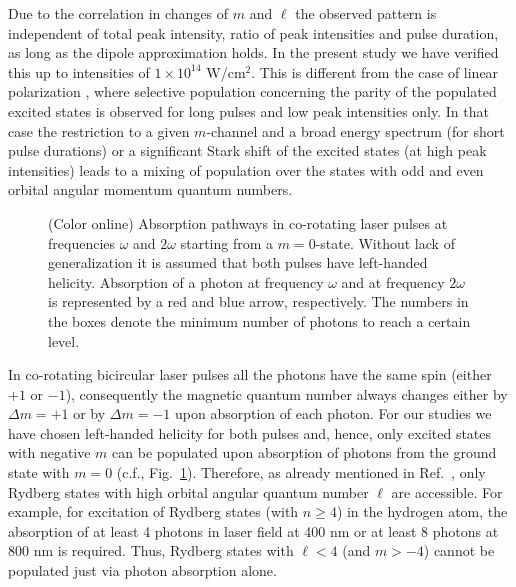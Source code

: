 Due to the correlation in changes of $m$ and $\ell$ the observed pattern is independent of total peak intensity, ratio of peak intensities and pulse duration, as long as the dipole approximation holds. In the present study we have verified this up to intensities of $1 \times 10^{14}$ W/cm$^2$. This is different from the case of linear polarization \cite{venzke18}, where selective population concerning the parity of the populated excited states is observed for long pulses and low peak intensities only. In that case the restriction to a given $m$-channel and a broad energy spectrum (for short pulse durations) or a significant Stark shift of the excited states (at high peak intensities) leads to a mixing of population over the states with odd and even orbital angular momentum quantum numbers.

\begin{figure}[h!]
 \centering
 \caption{\label{fig:co-pathways}
 (Color online) Absorption pathways in co-rotating laser pulses at frequencies $\omega$ and $2 \omega$ starting from a $m=0$-state. Without lack of generalization it is assumed that both pulses have left-handed helicity. Absorption of a photon at frequency $\omega$ and at frequency $2 \omega$ is represented by a red and blue arrow, respectively. The numbers in the boxes denote the minimum number of photons to reach a certain level.
 }
 \end{figure}

In co-rotating bicircular laser pulses all the photons have the same spin (either $+1$ or $-1$), consequently the magnetic quantum number always changes either by $\Delta m = +1$ or by $\Delta m = -1$ upon absorption of each photon. For our studies we have chosen left-handed helicity for both pulses and, hence, only excited states with negative $m$ can be populated upon absorption of photons from the ground state with $m=0$ (c.f., Fig.\ \ref{fig:co-pathways}). Therefore, as already mentioned in Ref.\ \cite{mancuso17}, only Rydberg states with high orbital angular quantum number $\ell$ are accessible. For example, for excitation of Rydberg states (with $n \ge 4$) in the hydrogen atom, the absorption of at least 4 photons in laser field at 400 nm or at least 8 photons at 800 nm is required. Thus, Rydberg states with $\ell < 4$ (and $m > -4$) cannot be populated just via photon absorption alone.

